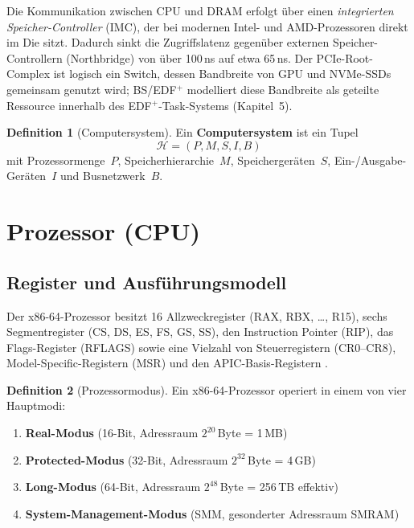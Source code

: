 ﻿\documentclass[a4paper,12pt]{scrreprt}
\theoremstyle{definition}
\newtheorem{definition}{Definition}[chapter]
\begin{document}
	Die Kommunikation zwischen CPU und DRAM erfolgt über einen
	\emph{integrierten Speicher-Controller} (IMC), der bei modernen Intel- und
	AMD-Prozessoren direkt im Die sitzt. Dadurch sinkt die Zugriffslatenz gegenüber
	externen Speicher-Controllern (Northbridge) von über 100\,ns auf etwa 65\,ns.
	Der PCIe-Root-Complex ist logisch ein Switch, dessen Bandbreite von GPU und
	NVMe-SSDs gemeinsam genutzt wird; BS/EDF$^+$ modelliert diese Bandbreite
	als geteilte Ressource innerhalb des EDF$^+$-Task-Systems (Kapitel~5).

	\begin{definition}[Computersystem]
		Ein \textbf{Computersystem} ist ein Tupel
		\[
		\mathcal{H} = (P, M, S, I, B)
		\]
		mit Prozessormenge~$P$, Speicherhierarchie~$M$, Speichergeräten~$S$,
		Ein-/Ausgabe-Geräten~$I$ und Busnetzwerk~$B$.
	\end{definition}
	
	\section{Prozessor (CPU)}
	
	\subsection{Register und Ausführungsmodell}
	
	Der x86-64-Prozessor besitzt 16 Allzweckregister (RAX, RBX, \ldots{}, R15),
	sechs Segmentregister (CS, DS, ES, FS, GS, SS), den Instruction Pointer (RIP),
	das Flags-Register (RFLAGS) sowie eine Vielzahl von Steuerregistern (CR0--CR8),
	Model-Specific-Registern (MSR) und den APIC-Basis-Registern \cite{Intel2023}.
	
	\begin{definition}[Prozessormodus]
		Ein x86-64-Prozessor operiert in einem von vier Hauptmodi:
		\begin{enumerate}
			\item \textbf{Real-Modus} (16-Bit, Adressraum $2^{20}$\,Byte = 1\,MB)
			\item \textbf{Protected-Modus} (32-Bit, Adressraum $2^{32}$\,Byte = 4\,GB)
			\item \textbf{Long-Modus} (64-Bit, Adressraum $2^{48}$\,Byte = 256\,TB effektiv)
			\item \textbf{System-Management-Modus} (SMM, gesonderter Adressraum SMRAM)
		\end{enumerate}
	\end{definition}
	
\end{document}
